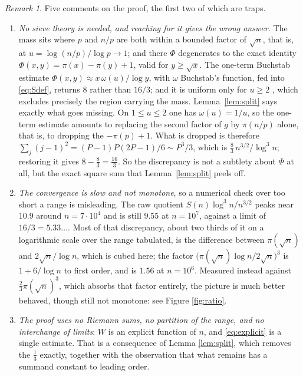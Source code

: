 \documentclass[a4paper,11pt,oneside,reqno]{amsart}
\theoremstyle{definition}
\theoremstyle{remark}
\newtheorem{remark}[definition]{Remark}
\theoremstyle{plain}
\begin{document}
\begin{remark}\label{rem:hypotheses}
  Five comments on the proof, the first two of which are traps.

  \begin{enumerate}
    \item \emph{No sieve theory is needed, and reaching for it gives the wrong
      answer.} The mass sits where \(p\) and \(n/p\) are both within a bounded
      factor of \(\sqrt n\), that is, at \(u = \log(n/p)/\log p \to 1\); and there
      \(\Phi\) degenerates to the exact identity \(\Phi(x,y) = \pi(x)-\pi(y)+1\),
      valid for \(y \ge \sqrt x\). The one-term Buchstab estimate
      \(\Phi(x,y) \approx x\,\omega(u)/\log y\), with \(\omega\) Buchstab's
      function, fed into \eqref{eq:Sdef}, returns \(8\) rather than \(16/3\);
      and it is uniform only for \(u \ge 2\) \cite{Fan}, which excludes precisely
      the region carrying the mass. Lemma~\ref{lem:split} says exactly what goes
      missing. On \(1 \le u \le 2\) one has \(\omega(u) = 1/u\), so the one-term
      estimate amounts to replacing the second factor of \(g\) by \(\pi(n/p)\)
      alone, that is, to dropping the \(-\pi(p)+1\). What is dropped is
      therefore \(\sum_j(j-1)^{2} = (P-1)P(2P-1)/6 \sim P^{3}/3\), which is
      \(\tfrac{8}{3}\,n^{3/2}/\log^{3}n\); restoring it gives
      \(8-\tfrac{8}{3} = \tfrac{16}3\). So the discrepancy is not a subtlety about
      \(\Phi\) at all, but the exact square sum that Lemma~\ref{lem:split}
      peels off.

    \item \emph{The convergence is slow and not monotone}, so a numerical check
      over too short a range is misleading. The raw quotient
      \(S(n)\log^{3}n/n^{3/2}\) peaks near \(10.9\) around \(n = 7 \cdot 10^{4}\)
      and is still \(9.55\) at \(n = 10^{7}\), against a limit of
      \(16/3 = 5.33\dots\). Most of that discrepancy, about two thirds of it on a
      logarithmic scale over the range tabulated, is the difference between
      \(\pi(\sqrt n)\) and \(2\sqrt n/\log n\), which is cubed here; the factor
      \(\bigl(\pi(\sqrt n)\log n/2\sqrt n\bigr)^{3}\) is \(1+6/\log n\) to first
      order, and is \(1.56\) at \(n = 10^{6}\). Measured instead against
      \(\tfrac{2}{3}\pi(\sqrt n)^{3}\), which absorbs that factor entirely, the
      picture is much better behaved, though still not monotone: see Figure
      \ref{fig:ratio}.

    \item \emph{The proof uses no Riemann sums, no partition of the range, and
      no interchange of limits}: \(W\) is an explicit function of \(n\), and
      \eqref{eq:explicit} is a single estimate. That is a consequence of Lemma
      \ref{lem:split}, which removes the \(\tfrac{1}{3}\) exactly, together with the
      observation that what remains has a summand constant to leading order.


\end{enumerate}
\end{remark}
\end{document}
